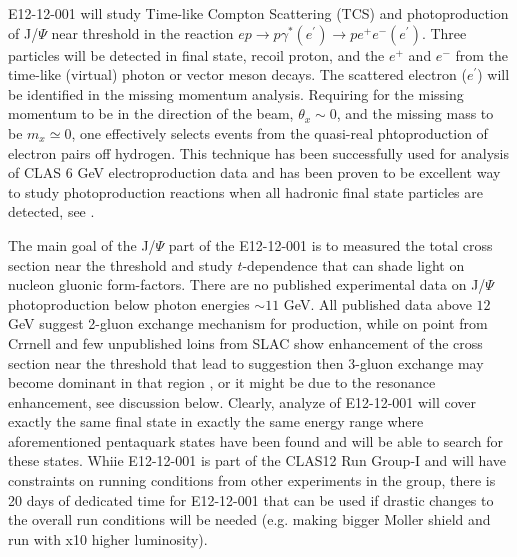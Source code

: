 \documentclass[12pt]{revtex4}
\begin{document}
E12-12-001 \cite{e1212001} will study Time-like Compton Scattering (TCS) and photoproduction of J/$\Psi$ near threshold in the reaction $e p\to p \gamma^* (e^\prime )\to  p e^+ e^- (e^\prime)$. Three particles will be detected in final state, recoil proton, and the $e^+$ and $e^-$ from the time-like (virtual) photon or vector meson decays. The scattered electron ($e^\prime$) will be identified in the missing momentum analysis. Requiring for the missing momentum to be in the direction of the beam, $\theta_x\sim0$, and the missing mass to be $m_x\simeq 0$, one effectively selects events from the quasi-real phtoproduction of electron pairs off hydrogen. This technique has been successfully used for analysis of CLAS 6 GeV electroproduction data and has been proven to be excellent way to study photoproduction reactions when all hadronic final state particles are detected, see  \cite{tcs_rafo, jpc_prop}. 

The main goal of the J/$\Psi$ part of the E12-12-001 is to measured the total cross section near the threshold and study $t$-dependence that can shade light on nucleon gluonic form-factors. There are no published experimental data on J/$\Psi$ photoproduction below photon energies $\sim 11$ GeV. All published data above $12$ GeV suggest 2-gluon exchange mechanism for production, while on point from Crrnell and few unpublished loins from SLAC show enhancement of the cross section near the threshold that lead to suggestion then 3-gluon exchange may become dominant in that region \cite{bchl}, or it might be due to the resonance enhancement, see discussion below. Clearly, analyze of E12-12-001 will cover exactly the same final state in exactly the same energy range where aforementioned pentaquark states have been found and will be able to search for these states. Whiie E12-12-001 is part of the CLAS12 Run Group-I and will have constraints on running conditions from other experiments in the group, there is 20 days of dedicated time for E12-12-001 that can be used if drastic changes to the overall run conditions will be needed (e.g. making bigger Moller shield and run with x10 higher luminosity).
\end{document}
